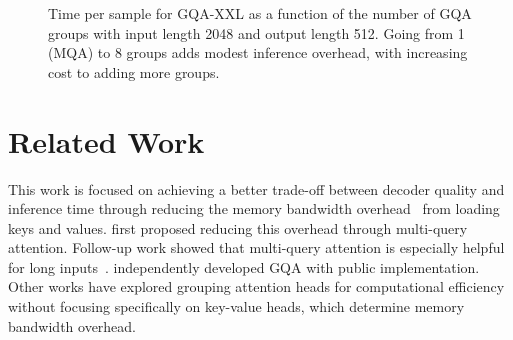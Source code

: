 \documentclass[11pt]{article}
\newcommand{\mh}{\textsc{MHA}\xspace}
\newcommand{\mq}{\textsc{MQA}\xspace}
\newcommand{\gmq}{\textsc{GQA}\xspace}
\begin{document}
\begin{figure}[h]
\centering
    \caption{Time per sample for \gmq-XXL as a function of the number of \gmq groups with input length 2048 and output length 512. Going from 1 (\mq) to 8 groups adds modest inference overhead, with increasing cost to adding more groups.}
    \label{fig:time_groups}
\end{figure}

\section{Related Work}

This work is focused on achieving a better trade-off between decoder quality and inference time through reducing the memory bandwidth overhead~\citep{roofline} from loading keys and values. \citet{shazeer2019mq} first proposed reducing this overhead through multi-query attention. Follow-up work showed that multi-query attention is especially helpful for long inputs~\citep{palminference, dejong2022fido}. \citet{gqamrabe} independently developed GQA with public implementation. Other works have explored grouping attention heads for computational efficiency~\citep{grouptrans, gmha, pillars} without focusing specifically on key-value heads, which determine memory bandwidth overhead.
\end{document}
